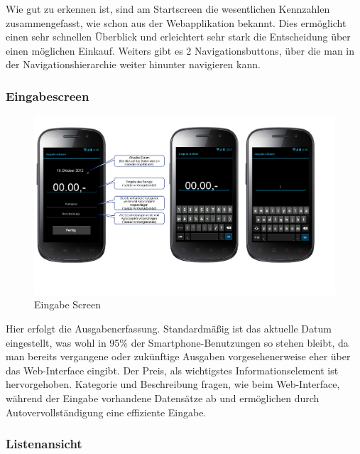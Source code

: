 Wie gut zu erkennen ist, sind am Startscreen die wesentlichen Kennzahlen zusammengefasst, wie schon aus der Webapplikation bekannt. Dies ermöglicht einen sehr schnellen Überblick und erleichtert sehr stark die Entscheidung über einen möglichen Einkauf. Weiters gibt es 2 Navigationsbuttons, über die man in der Navigationshierarchie weiter hinunter navigieren kann.

\subsubsection{Eingabescreen}

\begin{figure}[htl]
\centering
\includegraphics[width=\textwidth]{img/EingabeScreen}
\caption{Eingabe Screen}
\label{fig:eingabe_screen}
\end{figure}

Hier erfolgt die Ausgabenerfassung. Standardm\"aßig ist das aktuelle Datum eingestellt, was wohl in 95\% der Smartphone-Benutzungen so stehen bleibt, da man bereits vergangene oder zukünftige Ausgaben vorgesehenerweise eher über das Web-Interface eingibt. Der Preis, als wichtigstes Informationselement ist hervorgehoben. Kategorie und Beschreibung fragen, wie beim Web-Interface, während der Eingabe vorhandene Datens\"atze ab und erm\"oglichen durch Autovervollständigung eine effiziente Eingabe.

\subsubsection{Listenansicht}

